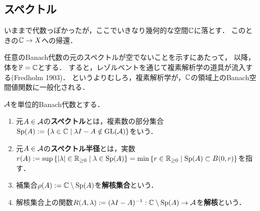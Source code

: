 \documentclass[uplatex,dvipdfmx]{jsreport}
\begin{document}
\subsection{スペクトル}

\begin{tcolorbox}[colframe=ForestGreen, colback=ForestGreen!10!white,breakable,colbacktitle=ForestGreen!40!white,coltitle=black,fonttitle=\bfseries\sffamily,
title=]
    いままで代数っぽかったが，ここでいきなり幾何的な空間$\mathbb{C}$に落とす．
    このときの$\mathbb{C}\to X$への帰還．

    任意のBanach代数の元のスペクトルが空でないことを示すにあたって，
    以降，体を$\mathbb{F}=\mathbb{C}$とする．
    すると，レゾルベントを通じて複素解析学の道具が流入する(Fredholm 1903)．
    というよりむしろ，複素解析学が，$\mathbb{C}$の領域上のBanach空間値関数に一般化される．
\end{tcolorbox}

\begin{definition}
    $\mathcal{A}$を単位的Banach代数とする．
    \begin{enumerate}
        \item 元$A\in\mathcal{A}$の\textbf{スペクトル}とは，複素数の部分集合$\mathrm{Sp}(A):=\left\{\lambda\in\mathbb{C}\mid\lambda I-A\notin\mathrm{GL}(\mathcal{A})\right\}$をいう．
        \item 元$A\in\mathcal{A}$の\textbf{スペクトル半径}とは，実数$r(A):=\sup\left\{\lvert\lambda\rvert\in\mathbb{R}_{\ge 0}\mid\lambda\in\mathrm{Sp}(A)\right\}=\min\left\{r\in\mathbb{R}_{\ge0}\mid\mathrm{Sp}(A)\subset B(0,r)\right\}$を指す．
        \item 補集合$\rho(A):=\mathbb{C}\setminus\mathrm{Sp}(A)$を\textbf{解核集合}という．
        \item 解核集合上の関数$R(A,\lambda):=(\lambda I-A)^{-1}:\mathbb{C}\setminus\mathrm{Sp}(A)\to\mathcal{A}$を\textbf{解核}という．
    \end{enumerate}
\end{definition}
\end{document}
